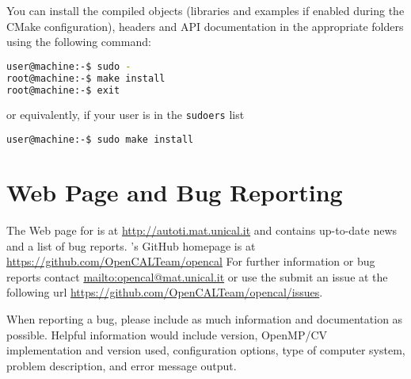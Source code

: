You can install the compiled objects (libraries and examples if enabled during the CMake configuration), headers and API documentation in the appropriate folders using the following command:

\begin{lstlisting}[language=bash,caption={OpenCAL installation},label={ch:quickstart:install}]
user@machine:-$ sudo - 
root@machine:-$ make install
root@machine:-$ exit
\end{lstlisting}

or equivalently, if your user is in the \texttt{sudoers} list
\begin{lstlisting}[language=bash,caption={OpenCAL sudo installation},label={ch:quickstart:sudoinstall}]
user@machine:-$ sudo make install
\end{lstlisting}




\section{Web Page and Bug Reporting}

The Web page for \texttt{\ocal} is at 
\url{http://autoti.mat.unical.it} and contains up-to-date news and
a list of bug reports. \ocal's GitHub homepage is at \url{https://github.com/OpenCALTeam/opencal} 
For further information or bug reports contact
\url{mailto:opencal@mat.unical.it} or use the submit an issue at the following url \url{https://github.com/OpenCALTeam/opencal/issues}.

When reporting a bug, please include as much information and
documentation as possible. Helpful information would include
\texttt{\ocal} version, OpenMP/CV implementation and version used,
configuration options, type of computer system, problem
description, and error message output.
